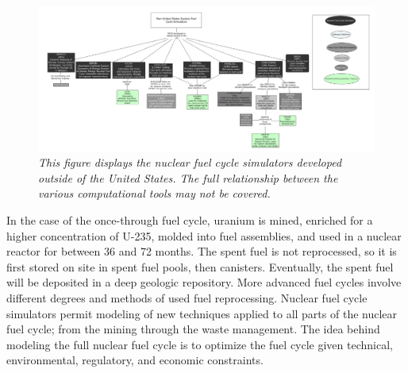 \documentclass[12pt]{UIdahoMastersThesis}
\begin{document}
\begin{figure}
\includegraphics[width=\textwidth]{Non-US_FUEL_TOOLS.png}
\caption{\small \sl This figure displays the nuclear fuel cycle simulators developed outside of the United States. The full relationship between the various computational tools may not be covered.}
\end{figure}
In the case of the once-through fuel cycle, uranium is mined, enriched for a higher concentration of U-235, molded into fuel assemblies, and used in a nuclear reactor for between 36 and 72 months. The spent fuel is not reprocessed, so it is first stored on site in spent fuel pools, then canisters. Eventually, the spent fuel will be deposited in a deep geologic repository. More advanced fuel cycles involve different degrees and methods of used fuel reprocessing. Nuclear fuel cycle simulators permit modeling of new techniques applied to all parts of the nuclear fuel cycle; from the mining through the waste management. The idea behind modeling the full nuclear fuel cycle is to optimize the fuel cycle given technical, environmental, regulatory, and economic constraints.
\end{document}

